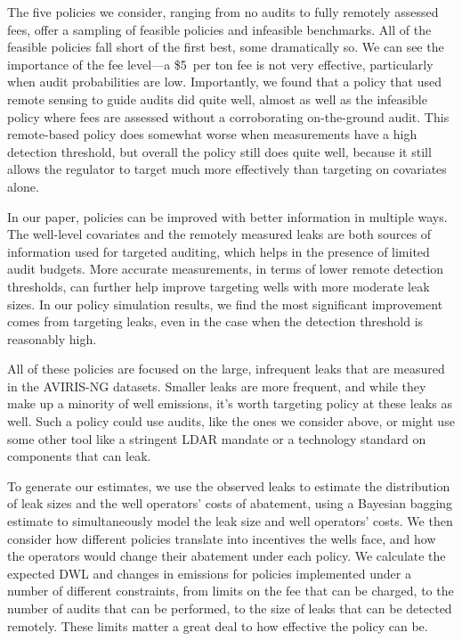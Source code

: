 \documentclass[12pt,oneside,letterpaper]{article}
\theoremstyle{definition}
\begin{document}
\begin{refsection}
The five policies we consider, ranging from no audits to fully remotely assessed fees, offer a sampling of feasible policies and infeasible benchmarks.
All of the feasible policies fall short of the first best, some dramatically so.
We can see the importance of the fee level---a \$5~per ton  fee is not very effective, particularly when audit probabilities are low.
Importantly, we found that a policy that used remote sensing to guide audits did quite well, almost as well as the infeasible policy where fees are assessed without a corroborating on-the-ground audit.
This remote-based policy does somewhat worse when measurements have a high detection threshold, but overall the policy still does quite well, because it still allows the regulator to target much more effectively than targeting on covariates alone.

In our paper, policies can be improved with better information in multiple ways.
The well-level covariates and the remotely measured leaks are both sources of information used for targeted auditing, which helps in the presence of limited audit budgets.
More accurate measurements, in terms of lower remote detection thresholds, can further help improve targeting wells with more moderate leak sizes.
In our policy simulation results, we find the most significant improvement comes from targeting leaks, even in the case when the detection threshold is reasonably high.

All of these policies are focused on the large, infrequent leaks that are measured in the \gls{AVIRIS-NG} datasets.
Smaller leaks are more frequent, and while they make up a minority of well emissions, it's worth targeting policy at these leaks as well.
Such a policy could use audits, like the ones we consider above, or might use some other tool like a stringent
\gls{LDAR} %
mandate or a technology standard on components that can leak.

To generate our estimates, we use the observed leaks to estimate the distribution of leak sizes and the well operators' costs of abatement, using a Bayesian bagging estimate to simultaneously model the leak size and well operators' costs.
We then consider how different policies translate into incentives the wells face, and how the operators would change their abatement under each policy.
We calculate the expected \gls{DWL} and changes in emissions for policies implemented under a number of different constraints, from limits on the fee that can be charged, to the number of audits that can be performed, to the size of leaks that can be detected remotely.
These limits matter a great deal to how effective the policy can be.


\end{refsection}
\end{document}
